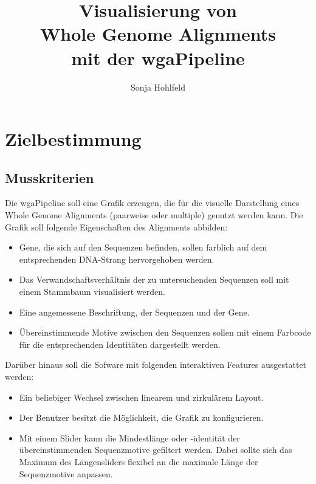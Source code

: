 \documentclass[a4paper]{scrreprt}
\begin{document}
 
\title{Visualisierung von \\ Whole Genome Alignments \\ mit der wgaPipeline}
\author{Sonja Hohlfeld}
\maketitle
 
\newpage 
\tableofcontents
 
\chapter{Zielbestimmung}
\section{Musskriterien}
Die wgaPipeline soll eine Grafik erzeugen, die für die visuelle Darstellung eines Whole Genome Alignments (paarweise oder multiple) genutzt werden kann. Die Grafik soll folgende Eigenschaften des Alignments abbilden: 
\begin{itemize}
  \item Gene, die sich auf den Sequenzen befinden, sollen farblich auf dem entsprechenden DNA-Strang hervorgehoben werden.
  \item Das Verwandschaftsverhältnis der zu untersuchenden Sequenzen soll mit einem Stammbaum visualisiert werden.
  \item Eine angemessene Beschriftung, der Sequenzen und der Gene.
  \item Übereinstimmende Motive zwischen den Sequenzen sollen mit einem Farbcode für die entsprechenden Identitäten dargestellt werden.
\end{itemize}
Darüber hinaus soll die Sofware mit folgenden interaktiven Features ausgestattet werden:
\begin{itemize}
  \item Ein beliebiger Wechsel zwischen linearem und zirkulärem Layout. 
  \item Der Benutzer besitzt die Möglichkeit, die Grafik zu konfigurieren. 
  \item Mit einem Slider kann die Mindestlänge oder -identität der übereinstimmenden Sequenzmotive gefiltert werden. Dabei sollte sich das Maximum des Längensliders flexibel an die maximale Länge der Sequenzmotive anpassen.
\end{itemize}
\end{document}
